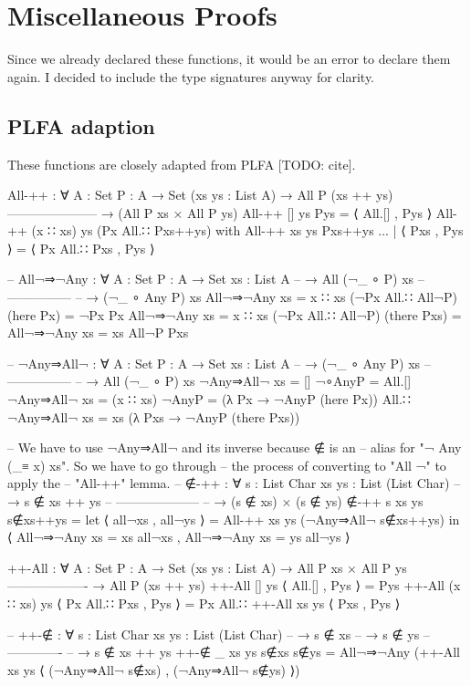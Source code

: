 \documentclass[logo,bsc,singlespacing,parskip,online]{infthesis}
\renewenvironment{code}{\mintedcopy[breaklines]{agda}}{\endmintedcopy}
\begin{document}
\appendix

\chapter{Miscellaneous Proofs}

Since we already declared these functions, it would be an error to declare them again. I decided to
include the type signatures anyway for clarity.

\section{PLFA adaption}

These functions are closely adapted from PLFA [TODO: cite].

\begin{code}
All-++ : ∀ {A : Set} {P : A → Set} (xs ys : List A)
  → All P (xs ++ ys)
    ---------------------
  → (All P xs × All P ys)
All-++ [] ys Pys = ⟨ All.[] , Pys ⟩
All-++ (x ∷ xs) ys (Px All.∷ Pxs++ys) with All-++ xs ys Pxs++ys
... | ⟨ Pxs , Pys ⟩ = ⟨ Px All.∷ Pxs , Pys ⟩

-- All¬⇒¬Any : ∀ {A : Set} {P : A → Set} {xs : List A}
--   → All (¬_ ∘ P) xs
--     ---------------
--   → (¬_ ∘ Any P) xs
All¬⇒¬Any {xs = x ∷ xs} (¬Px All.∷ All¬P) (here Px) = ¬Px Px
All¬⇒¬Any {xs = x ∷ xs} (¬Px All.∷ All¬P) (there Pxs) =
  All¬⇒¬Any {xs = xs} All¬P Pxs

-- ¬Any⇒All¬ : ∀ {A : Set} {P : A → Set} {xs : List A}
--   → (¬_ ∘ Any P) xs
--     ---------------
--   → All (¬_ ∘ P) xs
¬Any⇒All¬ {xs = []} ¬∘AnyP = All.[]
¬Any⇒All¬ {xs = (x ∷ xs)} ¬AnyP =
  (λ Px → ¬AnyP (here Px))
    All.∷ ¬Any⇒All¬ {xs = xs} (λ Pxs → ¬AnyP (there Pxs))

-- We have to use ¬Any⇒All¬ and its inverse because ∉ is an
-- alias for "¬ Any (_≡ x) xs".  So we have to go through
-- the process of converting to "All ¬" to apply the
-- "All-++" lemma.
-- ∉-++ : ∀ {s : List Char} {xs ys : List (List Char)}
--   → s ∉ xs ++ ys
--     --------------------
--   → (s ∉ xs) × (s ∉ ys)
∉-++ {s} {xs} {ys} s∉xs++ys =
  let ⟨ all¬xs , all¬ys ⟩ = All-++ xs ys (¬Any⇒All¬ s∉xs++ys) in
    ⟨ All¬⇒¬Any {xs = xs} all¬xs
    , All¬⇒¬Any {xs = ys} all¬ys ⟩

++-All : ∀ {A : Set} {P : A → Set} (xs ys : List A)
  → All P xs × All P ys
    -------------------
  → All P (xs ++ ys)
++-All [] ys ⟨ All.[] , Pys ⟩ = Pys
++-All (x ∷ xs) ys ⟨ Px All.∷ Pxs , Pys ⟩ =
  Px All.∷ ++-All xs ys ⟨ Pxs , Pys ⟩

-- ++-∉ : ∀ {s : List Char} {xs ys : List (List Char)}
--   → s ∉ xs
--   → s ∉ ys
--     -------------
--   → s ∉ xs ++ ys
++-∉ {_} {xs} {ys} s∉xs s∉ys =
  All¬⇒¬Any (++-All xs ys ⟨ (¬Any⇒All¬ s∉xs) , (¬Any⇒All¬ s∉ys) ⟩)
\end{code}
\end{document}
